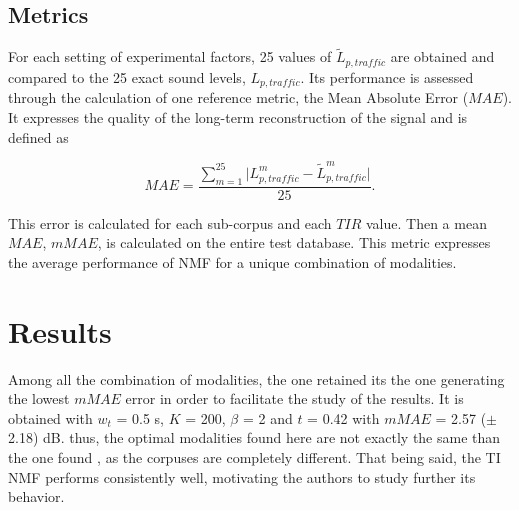 \documentclass[12pt,english,twoside]{article}
\begin{document}
\subsection{Metrics}
For each setting of experimental factors, 25 values of $\tilde{L}_{p,traffic}$ are obtained and compared to the 25 exact sound levels, $L_{p,traffic}$. Its performance is assessed through the calculation of one reference metric, the Mean Absolute Error ($MAE$). It expresses the quality of the long-term reconstruction of the signal and is defined as

\begin{equation}
MAE = \frac{\sum_{m = 1}^{25}\vert L^m_{p,traffic}-\tilde{L}^m_{p,traffic} \vert}{25}.
\end{equation}

This error is calculated for each sub-corpus and each $TIR$ value. Then a mean $MAE$, $mMAE$, is calculated on the entire test database. This metric expresses the average performance of NMF for a unique combination of modalities.

\section{Results}\label{part:results}

Among all the combination of modalities, the one retained its the one generating the lowest $mMAE$ error in order to facilitate the study of the results.
It is obtained with $w_t$ = 0.5 s, $K$ = 200, $\beta$ = 2 and $t$ = 0.42 with $mMAE$ = 2.57 ($\pm$ 2.18) dB.
thus, the optimal modalities found here are not exactly the same than the one found \cite{gloaguen2019road}, as the corpuses are completely different. That being said, the TI NMF performs consistently well, motivating the authors to study further its behavior.

\end{document}
